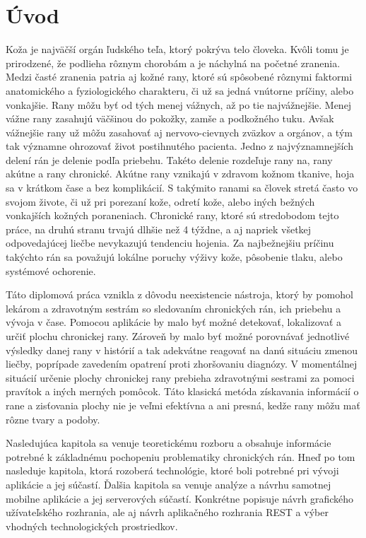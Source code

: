 \chapter{Úvod}
Koža je najväčší orgán ľudského teľa, ktorý pokrýva telo človeka. Kvôli tomu je prirodzené, že podlieha rôznym chorobám a je náchylná na početné zranenia. Medzi časté zranenia patria aj kožné rany, ktoré sú spôsobené rôznymi faktormi anatomického a fyziologického charakteru, či už sa jedná vnútorne príčiny, alebo vonkajšie. Rany môžu byť od tých menej vážnych, až po tie najvážnejšie. Menej vážne rany zasahujú väčšinou do pokožky, zamše a podkožného tuku. Avšak vážnejšie rany už môžu zasahovať aj nervovo-cievnych zväzkov a orgánov, a tým tak významne ohrozovať život postihnutého pacienta. Jedno z najvýznamnejších delení rán je delenie podľa priebehu. Takéto delenie rozdeľuje rany na, rany akútne a rany chronické. Akútne rany vznikajú v zdravom kožnom tkanive, hoja sa v krátkom čase a bez komplikácií. S takýmito ranami sa človek stretá často vo svojom živote, či už pri porezaní kože, odretí kože, alebo iných bežných vonkajších kožných poraneniach. Chronické rany, ktoré sú stredobodom tejto práce, na druhú stranu trvajú dlhšie než 4 týždne, a aj napriek všetkej odpovedajúcej liečbe nevykazujú tendenciu hojenia. Za najbežnejšiu príčinu takýchto rán sa považujú lokálne poruchy výživy kože, pôsobenie tlaku, alebo systémové ochorenie. 

Táto diplomová práca vznikla z dôvodu neexistencie nástroja, ktorý by pomohol lekárom a zdravotným sestrám so sledovaním chronických rán, ich priebehu a vývoja v čase. Pomocou aplikácie by malo byť možné detekovať, lokalizovať a určiť plochu chronickej rany. Zároveň by malo byť možné porovnávať jednotlivé výsledky danej rany v histórií a tak adekvátne reagovať na danú situáciu zmenou liečby, poprípade zavedením opatrení proti zhoršovaniu diagnózy. V momentálnej situácií určenie plochy chronickej rany prebieha zdravotnými sestrami za pomoci pravítok a iných merných pomôcok. Táto klasická metóda získavania informácií o rane a zisťovania plochy nie je veľmi efektívna a ani presná, kedže rany môžu mať rôzne tvary a podoby.
	
Nasledujúca kapitola sa venuje teoretickému rozboru a obsahuje informácie potrebné k základnému pochopeniu problematiky chronických rán. Hneď po tom nasleduje kapitola, ktorá rozoberá technológie, ktoré boli potrebné pri vývoji aplikácie a jej súčastí. Ďalšia kapitola sa venuje analýze a návrhu samotnej mobilne aplikácie a jej serverových súčastí. Konkrétne popisuje návrh grafického užívateľského rozhrania, ale aj návrh aplikačného rozhrania REST a výber vhodných technologických prostriedkov.